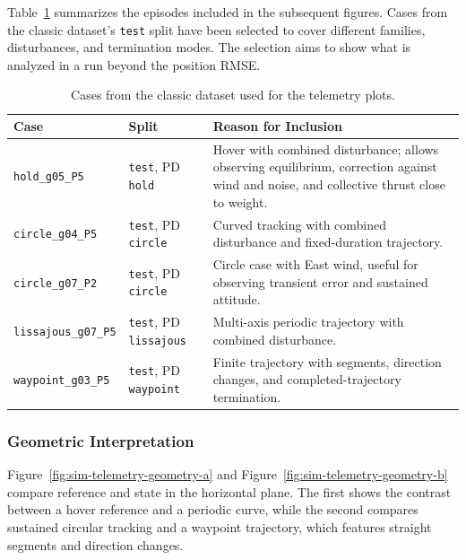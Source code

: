 Table~\ref{tab:casos-telemetria-anejo} summarizes the episodes included in the subsequent figures. Cases from the classic dataset's \texttt{test} split have been selected to cover different families, disturbances, and termination modes. The selection aims to show what is analyzed in a run beyond the position RMSE.

\begin{table}[H]
\caption{Cases from the classic dataset used for the telemetry plots.}
\label{tab:casos-telemetria-anejo}
\small
\setlength{\tabcolsep}{4pt}
\begin{tabularx}{\textwidth}{>{\raggedright\arraybackslash}p{} >{\raggedright\arraybackslash}p{} X}
\toprule
Case & Split & Reason for Inclusion \\
\midrule
\texttt{hold\_g05\_P5} & \texttt{test}, PD \texttt{hold} & Hover with combined disturbance; allows observing equilibrium, correction against wind and noise, and collective thrust close to weight. \\
\texttt{circle\_g04\_P5} & \texttt{test}, PD \texttt{circle} & Curved tracking with combined disturbance and fixed-duration trajectory. \\
\texttt{circle\_g07\_P2} & \texttt{test}, PD \texttt{circle} & Circle case with East wind, useful for observing transient error and sustained attitude. \\
\texttt{lissajous\_g07\_P5} & \texttt{test}, PD \texttt{lissajous} & Multi-axis periodic trajectory with combined disturbance. \\
\texttt{waypoint\_g03\_P5} & \texttt{test}, PD \texttt{waypoint} & Finite trajectory with segments, direction changes, and completed-trajectory termination. \\
\bottomrule
\end{tabularx}
\end{table}

\subsubsection*{Geometric Interpretation}

Figure~\ref{fig:sim-telemetry-geometry-a} and Figure~\ref{fig:sim-telemetry-geometry-b} compare reference and state in the horizontal plane. The first shows the contrast between a hover reference and a periodic curve, while the second compares sustained circular tracking and a waypoint trajectory, which features straight segments and direction changes.

